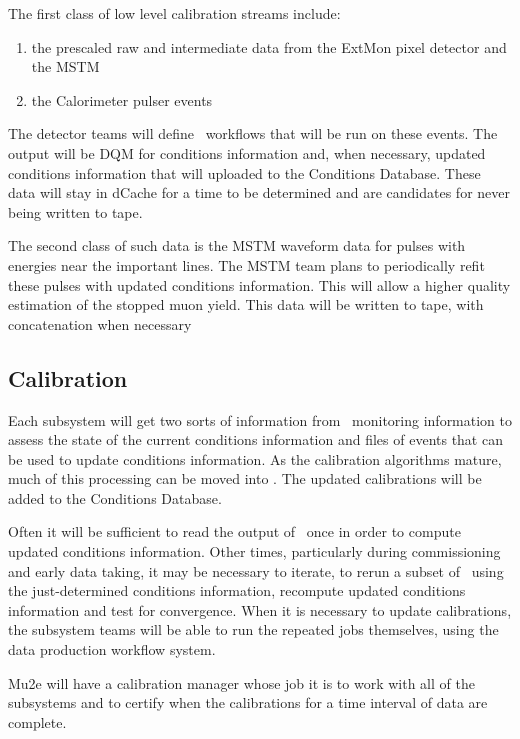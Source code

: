 The first class of low level calibration streams include:
\begin{enumerate}
    \item the prescaled raw and intermediate data from the ExtMon pixel detector and the MSTM
    \item the Calorimeter pulser events
\end{enumerate}
The detector teams will define \passone\ workflows that will be run on these events. The output will be DQM for conditions information and, when necessary, updated conditions information that will uploaded to the Conditions Database.   These data will stay in dCache for a time to be determined and are candidates for never being written to tape.

The second class of such data is the MSTM waveform data for pulses with energies near the important lines.  The MSTM team plans to periodically refit these pulses with updated conditions information.   This will allow a higher quality estimation of the stopped muon yield.  This data will be  written to tape, with concatenation when necessary

\subsection{Calibration}
\label{ssec:calibration}

Each subsystem will get two sorts of information from \passone\, monitoring information to assess the state of the current conditions information and files of events that can be used to update conditions information.
As the calibration algorithms mature, much of this processing can be moved into \passone.
The updated calibrations will be added to the Conditions Database.

Often it will be sufficient to read the output of \passone\ once in order to compute updated conditions information.
Other times, particularly during commissioning and early data taking, it may be necessary to iterate, to rerun a subset of \passone\ using the just-determined conditions information, recompute updated conditions information and test for convergence.
When it is necessary to update calibrations, the subsystem teams will be able to run the repeated \passone jobs themselves, using the data production workflow system.

Mu2e will have a calibration manager whose job it is to work with all of the subsystems and to certify when the calibrations for a time interval of data are complete.

